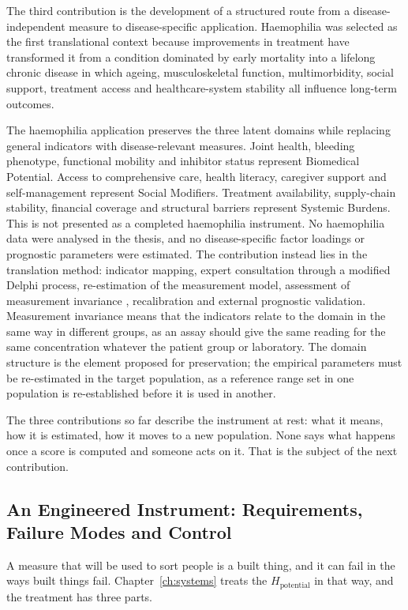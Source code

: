 The third contribution is the development of a structured route from a disease-independent measure to disease-specific application. Haemophilia was selected as the first translational context because improvements in treatment have transformed it from a condition dominated by early mortality into a lifelong chronic disease in which ageing, musculoskeletal function, multimorbidity, social support, treatment access and healthcare-system stability all influence long-term outcomes.

The haemophilia application preserves the three latent domains while replacing general indicators with disease-relevant measures. Joint health, bleeding phenotype, functional mobility and inhibitor status represent Biomedical Potential. Access to comprehensive care, health literacy, caregiver support and self-management represent Social Modifiers. Treatment availability, supply-chain stability, financial coverage and structural barriers represent Systemic Burdens. This is not presented as a completed haemophilia instrument. No haemophilia data were analysed in the thesis, and no disease-specific factor loadings or prognostic parameters were estimated. The contribution instead lies in the translation method: indicator mapping, expert consultation through a modified Delphi process, re-estimation of the measurement model, assessment of measurement invariance \citep{meredith_1993,vandenberg_lance_2000}, recalibration and external prognostic validation. Measurement invariance means that the indicators relate to the domain in the same way in different groups, as an assay should give the same reading for the same concentration whatever the patient group or laboratory. The domain structure is the element proposed for preservation; the empirical parameters must be re-estimated in the target population, as a reference range set in one population is re-established before it is used in another.

The three contributions so far describe the instrument at rest: what it means,
how it is estimated, how it moves to a new population. None says what happens
once a score is computed and someone acts on it. That is the subject of the
next contribution.

\subsection{An Engineered Instrument: Requirements, Failure Modes and Control}
\label{sec:conc-engineered}

A measure that will be used to sort people is a built thing, and it can fail in
the ways built things fail. Chapter~\ref{ch:systems} treats the
$H_{\text{potential}}$ in that way, and the treatment has three parts.

